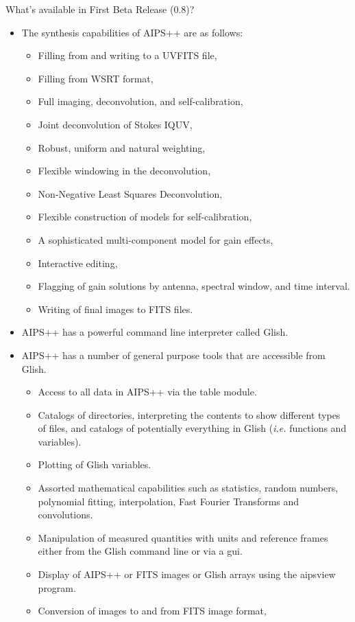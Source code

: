 \begin{slide}{What's available in First Beta Release (0.8)?}
\begin{itemize}
\item The synthesis capabilities of AIPS++ are as follows:
\begin{itemize}
\item Filling from and writing to a UVFITS file,
\item Filling from WSRT format,
\item Full imaging, deconvolution, and self-calibration,
\item Joint deconvolution of Stokes IQUV,
\item Robust, uniform and natural weighting,
\item Flexible windowing in the deconvolution,
\item Non-Negative Least Squares Deconvolution,
\item Flexible construction of models for self-calibration,
\item A sophisticated multi-component model for gain effects,
\item Interactive editing,
\item Flagging of gain solutions by antenna, spectral window, and
time interval.
\item Writing of final images to FITS files.
\end{itemize}
\item AIPS++ has a powerful command line interpreter called Glish.
\item AIPS++ has a number of general purpose tools that are accessible
from Glish.
\begin{itemize}
\item Access to all data in AIPS++ via the table module.
\item Catalogs of directories, interpreting the contents to show 
different types of files, and catalogs of potentially everything in Glish
({\em i.e.} functions and variables).
\item Plotting of Glish variables.
\item Assorted mathematical capabilities such as 
statistics, random numbers, polynomial fitting, interpolation,
Fast Fourier Transforms and convolutions.
\item Manipulation of measured quantities with units and reference
frames either from the Glish command line or via a gui.
\item Display of AIPS++ or FITS images or Glish arrays using the
aipsview program.
\item Conversion of images to and from FITS image format, 

\end{itemize}
\end{itemize}
\end{slide}
